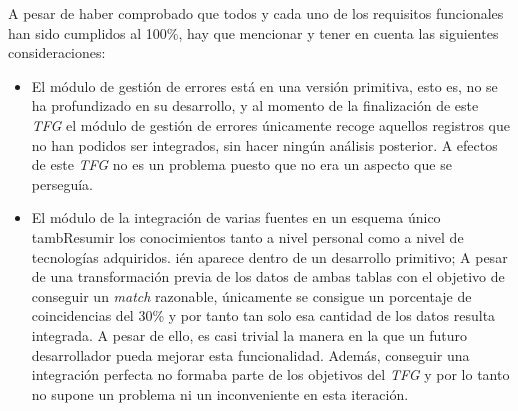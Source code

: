  A pesar de haber comprobado que todos y cada uno de los requisitos funcionales han sido cumplidos al 100\%, hay que mencionar y tener en cuenta las siguientes consideraciones:
\begin{itemize}
\item El módulo de gestión de errores está en una versión primitiva, esto es, no se ha profundizado en su desarrollo, y al momento de la finalización de este \textit{TFG} el módulo de gestión de errores únicamente recoge aquellos registros que no han podidos ser integrados, sin hacer ningún análisis posterior. A efectos de este \textit{TFG} no es un problema puesto que no era un aspecto que se perseguía. 
\item El módulo de la integración de varias fuentes en un esquema único tambResumir los conocimientos tanto a nivel personal como a nivel de tecnologías adquiridos.
ién aparece dentro de un desarrollo primitivo; A pesar de una transformación previa de los datos de ambas tablas con el objetivo de conseguir un \textit{match} razonable, únicamente se consigue un porcentaje de coincidencias del 30\% y por tanto tan solo esa cantidad de los datos resulta integrada. A pesar de ello, es casi trivial la manera en la que un futuro desarrollador pueda mejorar esta funcionalidad. Además, conseguir una integración perfecta no formaba parte de los objetivos del \textit{TFG} y por lo tanto no supone un problema ni un inconveniente en esta iteración.
\end{itemize}

